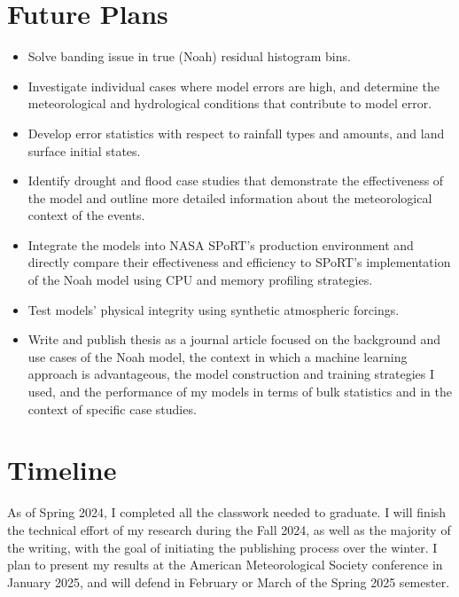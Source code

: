 \documentclass[11pt]{article}
\begin{document}
\section{Future Plans}

\begin{itemize}\itemsep.5em
        \item Solve banding issue in true (Noah) residual histogram bins.
        \item Investigate individual cases where model errors are high, and determine the meteorological and hydrological conditions that contribute to model error.
        \item Develop error statistics with respect to rainfall types and amounts, and land surface initial states.
        \item Identify drought and flood case studies that demonstrate the effectiveness of the model and outline more detailed information about the meteorological context of the events.
        \item Integrate the models into NASA SPoRT's production environment and directly compare their effectiveness and efficiency to SPoRT's implementation of the Noah model using CPU and memory profiling strategies.
        \item Test models' physical integrity using synthetic atmospheric forcings.
        \item Write and publish thesis as a journal article focused on the background and use cases of the Noah model, the context in which a machine learning approach is advantageous, the model construction and training strategies I used, and the performance of my models in terms of bulk statistics and in the context of specific case studies.
\end{itemize}

\section{Timeline}

As of Spring 2024, I completed all the classwork needed to graduate. I will finish the technical effort of my research during the Fall 2024, as well as the majority of the writing, with the goal of initiating the publishing process over the winter. I plan to present my results at the American Meteorological Society conference in January 2025, and will defend in February or March of the Spring 2025 semester.
\end{document}
